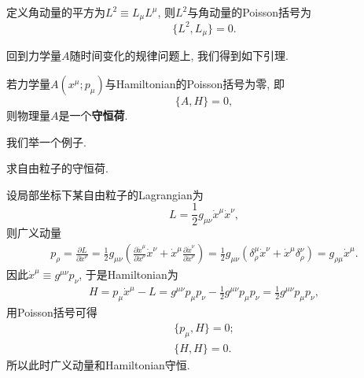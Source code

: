 		定义角动量的平方为$L^2\equiv L_\mu L^\mu$, 则$L^2$与角动量的Poisson括号为
		\begin{equation}\label{eq:[L^2,L]}
			\{L^2,L_\mu\}=0.
		\end{equation}

		回到力学量$A$随时间变化的规律问题上, 我们得到如下引理.
		\begin{lemma}
		若力学量$A(x^\mu;p_\mu)$与Hamiltonian的Poisson括号为零, 即
		\begin{equation}
			\{A,H\}=0,
		\end{equation}
		则物理量$A$是一个\textbf{守恒荷}.
		\end{lemma}
		我们举一个例子.
		\begin{example}
			求自由粒子的守恒荷.

		设局部坐标下某自由粒子的Lagrangian为
		$$L=\frac{1}{2}g_{\mu\nu}\dot{x}^\mu\dot{x}^\nu,$$
		则广义动量
		\begin{eqnarray*}
			p_\rho=\frac{\partial L}{\partial {\dot{x}}^\rho}=\frac{1}{2}g_{\mu\nu}\left(\frac{\partial \dot{x}^\mu}{\partial {\dot{x}}^\rho}\dot{x}^\nu+\dot{x}^\mu\frac{\partial \dot{x}^\nu}{\partial {\dot{x}}^\rho}\right)=\frac{1}{2}g_{\mu\nu}\left(\delta^\mu_\rho\dot{x}^\nu+\dot{x}^\mu\delta^\nu_\rho\right)=g_{\rho\mu}\dot{x}^\mu.
		\end{eqnarray*}
		因此$\dot{x}^\mu\equiv g^{\mu\nu}p_\nu$, 于是Hamiltonian为
		\begin{eqnarray*}
			H=p_\mu{\dot{x}}^\mu-L=g^{\mu\nu}p_\mu p_\nu-\frac{1}{2}g^{\mu\nu}p_\mu p_\nu=\frac{1}{2}g^{\mu\nu}p_\mu p_\nu,
		\end{eqnarray*}
		用Poisson括号可得
		\begin{eqnarray*}
			\{p_\mu,H\}=0;\\
			\{H,H\}=0.
		\end{eqnarray*}
		所以此时广义动量和Hamiltonian守恒.
		\end{example}


